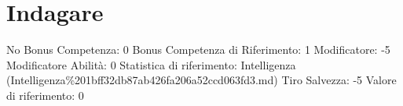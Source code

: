 \section{Indagare}\label{indagare}

\begin{description}
\tightlist
\item[Tags: ABI]
No Bonus Competenza: 0 Bonus Competenza di Riferimento: 1 Modificatore:
-5 Modificatore Abilità: 0 Statistica di riferimento: Intelligenza
(Intelligenza\%201bff32db87ab426fa206a52ccd063fd3.md) Tiro Salvezza: -5
Valore di riferimento: 0
\end{description}

